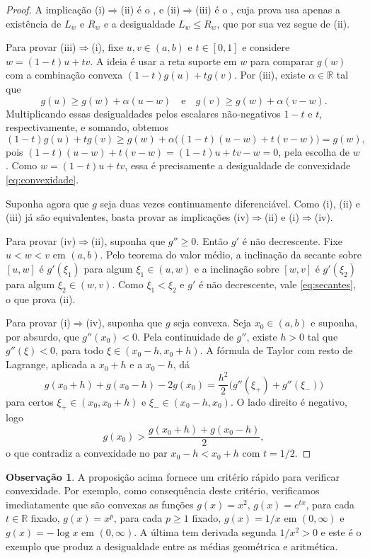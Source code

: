 \documentclass[12pt,portuguese]{article}
\theoremstyle{definition}
\newtheorem{remark}[remark]{Observação}
\theoremstyle{plainexercise}
\theoremstyle{starredexercise}
\theoremstyle{definition}
\begin{document}
\begin{proof}
A implicação (i)$\Rightarrow$(ii) é o , e
(ii)$\Rightarrow$(iii) é o , cuja prova usa apenas a
existência de $L_w$ e $R_w$ e a desigualdade $L_w\leqslant R_w$, que por sua
vez segue de (ii).

Para provar (iii)$\Rightarrow$(i), fixe $u,v\in(a,b)$ e $t\in[0,1]$ e
considere $w=(1-t)u+tv$. A ideia é usar a reta suporte em $w$ para comparar
$g(w)$ com a combinação convexa $(1-t)g(u)+tg(v)$. Por (iii), existe
$\alpha\in\mathbb{R}$ tal que
\[
g(u)\geqslant g(w)+\alpha(u-w)
\quad\text{e}\quad
g(v)\geqslant g(w)+\alpha(v-w).
\]
Multiplicando essas desigualdades pelos escalares não-negativos $1-t$ e $t$,
respectivamente, e somando, obtemos
\[
(1-t)g(u)+tg(v)
\geqslant
g(w)+\alpha\bigl((1-t)(u-w)+t(v-w)\bigr)
=
g(w),
\]
pois $(1-t)(u-w)+t(v-w)=(1-t)u+tv-w=0$, pela escolha de $w$.
Como $w=(1-t)u+tv$, essa é precisamente a desigualdade de convexidade
\eqref{eq:convexidade}.

\bigskip 
Suponha agora que $g$ seja duas vezes continuamente diferenciável. Como
(i), (ii) e (iii) já são equivalentes, basta provar as implicações
(iv)$\Rightarrow$(ii) e (i)$\Rightarrow$(iv).

Para provar (iv)$\Rightarrow$(ii), suponha que $g''\geqslant0$. Então
$g'$ é não decrescente. Fixe $u<w<v$ em $(a,b)$. Pelo teorema do valor médio,
a inclinação da secante
sobre $[u,w]$ é $g'(\xi_1)$ para algum $\xi_1\in(u,w)$ e a inclinação sobre
$[w,v]$ é $g'(\xi_2)$ para algum $\xi_2\in(w,v)$. Como $\xi_1<\xi_2$ e $g'$ é
não decrescente, vale \eqref{eq:secantes}, o que prova (ii).

Para provar (i)$\Rightarrow$(iv), suponha que $g$ seja convexa.
Seja $x_0\in(a,b)$ e suponha, por
absurdo, que $g''(x_0)<0$. Pela continuidade de $g''$, existe $h>0$ tal que
$g''(\xi)<0$, para todo $\xi\in (x_0-h,x_0+h)$. A fórmula de Taylor com resto de Lagrange, aplicada
a $x_0+h$ e a $x_0-h$, dá
\[
g(x_0+h)+g(x_0-h)-2g(x_0)
=
\frac{h^2}{2}\bigl(g''(\xi_+)+g''(\xi_-)\bigr)
\]
para certos $\xi_+\in(x_0,x_0+h)$ e $\xi_-\in(x_0-h,x_0)$. O lado direito é
negativo, logo
\[
g(x_0)>\frac{g(x_0+h)+g(x_0-h)}{2},
\]
o que contradiz a convexidade no par $x_0-h<x_0+h$ com $t=1/2$.
\end{proof}

\begin{remark}\label{rem:convexidade-exemplos}
A proposição acima fornece um critério rápido para verificar convexidade. 
Por exemplo, como consequência deste critério, verificamos imediatamente que são convexas as funções
$g(x)= x^2$, $g(x)= e^{tx}$, para cada $t\in\mathbb{R}$ fixado, $g(x)= x^p$, para cada $p\geqslant1$ fixado, 
$g(x)=1/x$ em $(0,\infty)$ e $g(x)=-\log x$ em
$(0,\infty)$. A última tem derivada segunda $1/x^2>0$ e este é o exemplo que
produz a desigualdade entre as médias geométrica e aritmética.
\end{remark}
\end{document}
